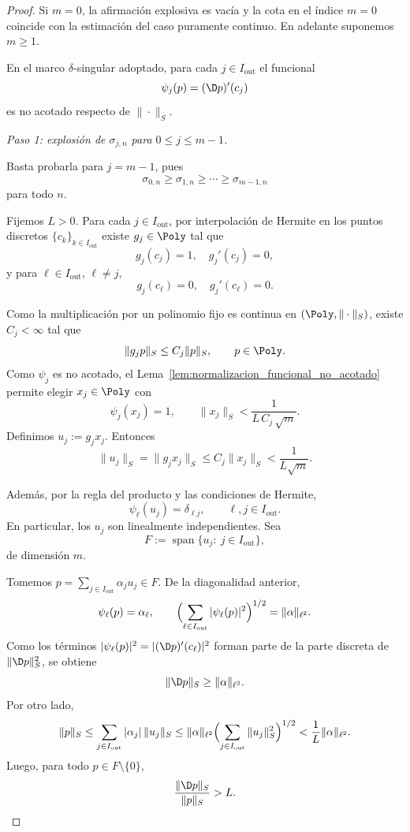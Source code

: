 \begin{proof}
	Si $m=0$, la afirmación explosiva es vacía y la cota en el índice $m=0$ coincide con la
	estimación del caso puramente continuo. En adelante suponemos $m\ge 1$.

	En el marco $\delta$-singular adoptado, para cada $j\in I_{\mathrm{out}}$ el funcional
	\[
		\psi_j(p)=(\D p)'(c_j)
	\]
	es no acotado respecto de $\|\cdot\|_S$.

	\medskip
	\noindent
	\emph{Paso 1: explosión de $\sigma_{j,n}$ para $0\le j\le m-1$.}

	Basta probarla para $j=m-1$, pues
	\[
		\sigma_{0,n}\ge\sigma_{1,n}\ge\cdots\ge\sigma_{m-1,n}
	\]
	para todo $n$.

	Fijemos $L>0$. Para cada $j\in I_{\mathrm{out}}$, por interpolación de Hermite en los
	puntos discretos $\{c_k\}_{k\in I_{\mathrm{out}}}$ existe $g_j\in\Poly$ tal que
	\[
		g_j(c_j)=1,\quad g_j'(c_j)=0,
	\]
	y para $\ell\in I_{\mathrm{out}}$, $\ell\ne j$,
	\[
		g_j(c_\ell)=0,\quad g_j'(c_\ell)=0.
	\]

	Como la multiplicación por un polinomio fijo es continua en
	$(\Poly,\|\cdot\|_S)$, existe $C_j<\infty$ tal que
	\[
		\|g_jp\|_S\le C_j\|p\|_S,
		\qquad p\in\Poly.
	\]
	Como $\psi_j$ es no acotado, el Lema~\ref{lem:normalizacion_funcional_no_acotado}
	permite elegir $x_j\in\Poly$ con
	\[
		\psi_j(x_j)=1,
		\qquad
		\|x_j\|_S<\frac{1}{L\,C_j\,\sqrt m}.
	\]
	Definimos $u_j:=g_jx_j$. Entonces
	\[
		\|u_j\|_S=\|g_jx_j\|_S\le C_j\|x_j\|_S<\frac{1}{L\sqrt m}.
	\]

	Además, por la regla del producto y las condiciones de Hermite,
	\[
		\psi_\ell(u_j)=\delta_{\ell j},
		\qquad \ell,j\in I_{\mathrm{out}}.
	\]
	En particular, los $u_j$ son linealmente independientes. Sea
	\[
		F:=\operatorname{span}\{u_j:\ j\in I_{\mathrm{out}}\},
	\]
	de dimensión $m$.

	Tomemos $p=\sum_{j\in I_{\mathrm{out}}}\alpha_ju_j\in F$. De la diagonalidad anterior,
	\[
		\psi_\ell(p)=\alpha_\ell,
		\qquad
		\Bigl(\sum_{\ell\in I_{\mathrm{out}}}|\psi_\ell(p)|^2\Bigr)^{1/2}=\|\alpha\|_{\ell^2}.
	\]
	Como los términos $|\psi_\ell(p)|^2=|(\D p)'(c_\ell)|^2$ forman parte de la parte
	discreta de $\|\D p\|_S^2$, se obtiene
	\[
		\|\D p\|_S\ge \|\alpha\|_{\ell^2}.
	\]
	Por otro lado,
	\[
		\|p\|_S
		\le
		\sum_{j\in I_{\mathrm{out}}}|\alpha_j|\,\|u_j\|_S
		\le
		\|\alpha\|_{\ell^2}\Bigl(\sum_{j\in I_{\mathrm{out}}}\|u_j\|_S^2\Bigr)^{1/2}
		<
		\frac1L\|\alpha\|_{\ell^2}.
	\]
	Luego, para todo $p\in F\setminus\{0\}$,
	\[
		\frac{\|\D p\|_S}{\|p\|_S}>L.
	\]


\end{proof}
